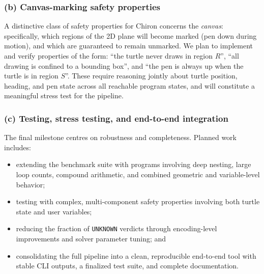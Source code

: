 \subsubsection*{(b) Canvas-marking safety properties}
A distinctive class of safety properties for Chiron concerns the \emph{canvas}: specifically, which regions of the 2D plane will become marked (pen down during motion), and which are guaranteed to remain unmarked. We plan to implement and verify properties of the form: ``the turtle never draws in region $R$'', ``all drawing is confined to a bounding box'', and ``the pen is always up when the turtle is in region $S$''. These require reasoning jointly about turtle position, heading, and pen state across all reachable program states, and will constitute a meaningful stress test for the pipeline.

\subsubsection*{(c) Testing, stress testing, and end-to-end integration}
The final milestone centres on robustness and completeness. Planned work includes:
\begin{itemize}[leftmargin=1.5em]
  \item extending the benchmark suite with programs involving deep nesting, large loop counts, compound arithmetic, and combined geometric and variable-level behavior;
  \item testing with complex, multi-component safety properties involving both turtle state and user variables;
  \item reducing the fraction of \texttt{UNKNOWN} verdicts through encoding-level improvements and solver parameter tuning; and
  \item consolidating the full pipeline into a clean, reproducible end-to-end tool with stable CLI outputs, a finalized test suite, and complete documentation.
\end{itemize}

